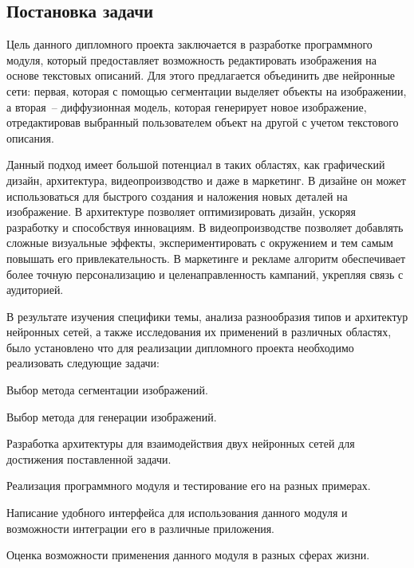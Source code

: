 \subsection{Постановка задачи}

Цель данного дипломного проекта заключается в разработке программного модуля, который предоставляет возможность редактировать изображения на основе текстовых описаний. Для этого предлагается объединить две нейронные сети: первая, которая с помощью сегментации выделяет объекты на изображении, а вторая~-- диффузионная модель, которая генерирует новое изображение, отредактировав выбранный пользователем объект на другой с учетом текстового описания. 

Данный подход имеет большой потенциал в таких областях, как графический дизайн, архитектура, видеопроизводство и даже в маркетинг. В дизайне он может использоваться для быстрого создания и наложения новых деталей на изображение. В архитектуре позволяет оптимизировать дизайн, ускоряя разработку и способствуя инновациям. В видеопроизводстве позволяет добавлять сложные визуальные эффекты, экспериментировать с окружением и тем самым повышать его привлекательность. В маркетинге и рекламе алгоритм обеспечивает более точную персонализацию и целенаправленность кампаний, укрепляя связь с аудиторией.

В результате изучения специфики темы, анализа разнообразия типов и архитектур нейронных сетей, а также исследования их применений в различных областях, было установлено что для реализации дипломного проекта необходимо реализовать следующие задачи:

\begin{enumerate_num}
    \item Выбор метода сегментации изображений.
    \item Выбор метода для генерации изображений.
    \item Разработка архитектуры для взаимодействия двух нейронных сетей для достижения поставленной задачи. 
    \item Реализация программного модуля и тестирование его на разных примерах.
    \item Написание удобного интерфейса для использования данного модуля и возможности интеграции его в различные приложения.
    \item Оценка возможности применения данного модуля в разных сферах жизни.
\end{enumerate_num}

